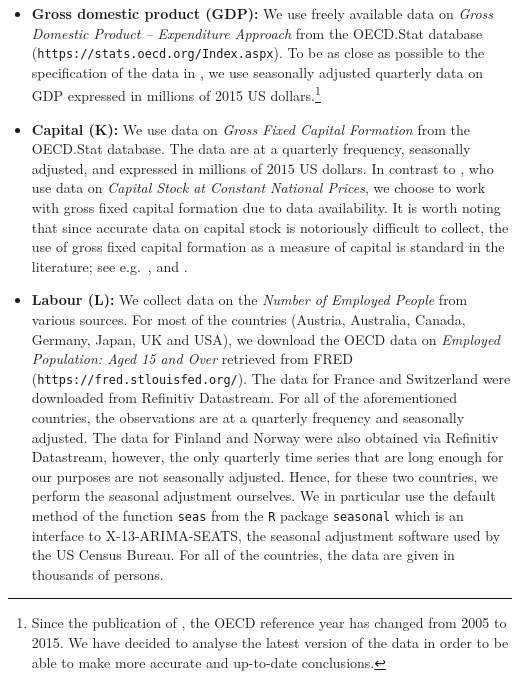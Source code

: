 \documentclass[12pt]{article}
\begin{document}
\begin{itemize}[leftmargin=0.5cm, itemsep=0pt, parsep=0pt, topsep=3pt]
\item \textbf{Gross domestic product ($\boldsymbol{GDP}$):} We use freely available data on \textit{Gross Domestic Product -- Expenditure Approach} from the OECD.Stat %
database (\texttt{https://stats.\linebreak oecd.org/Index.aspx}). To be as close as possible to the specification of the data in \cite{Zhang2012}, we use seasonally adjusted quarterly data on GDP expressed in millions of 2015 US dollars.\footnote{Since the publication of \cite{Zhang2012}, the OECD reference year has changed from 2005 to 2015. We have decided to analyse the latest version of the data in order to be able to make more accurate and up-to-date conclusions.} 

\item \textbf{Capital ($\boldsymbol{K}$):} We use data on \textit{Gross Fixed Capital Formation} from the OECD.Stat %
database. The data are at a quarterly frequency, seasonally adjusted, and expressed in millions of $2015$ US dollars. In contrast to \cite{Zhang2012}, who use data on \textit{Capital Stock at Constant National Prices}, we choose to work with gross fixed capital formation due to data availability. It is worth noting that since accurate data on capital stock is notoriously difficult to collect, the use of gross fixed capital formation as a measure of capital is standard in the literature; see e.g.\ \cite{Sharma1994}, \cite{Lee2002} and \cite{Lee2005}.

\item \textbf{Labour ($\boldsymbol{L}$):} We collect data on the \textit{Number of Employed People} from various sources. For most of the countries (Austria, Australia, Canada, Germany, Japan, UK and USA), we download the OECD data on \textit{Employed Population: Aged 15 and Over} retrieved from FRED (\texttt{https://fred.stlouisfed.org/}). %
The data for France and Switzerland were downloaded from Refinitiv Datastream. For all of the aforementioned countries, the observations are at a quarterly frequency and seasonally adjusted. The data for Finland and Norway were also obtained via Refinitiv Datastream, however, the only quarterly time series that are long enough for our purposes are not seasonally adjusted. Hence, for these two countries, we perform the seasonal adjustment ourselves. We in particular use the default method of the function \verb|seas| from the \verb|R| package \verb|seasonal| \citep*{Sax2018} which is an interface to X-13-ARIMA-SEATS, the seasonal adjustment software used by the US Census Bureau. 
For all of the countries, the data are given in thousands of persons.


\end{itemize}
\end{document}
